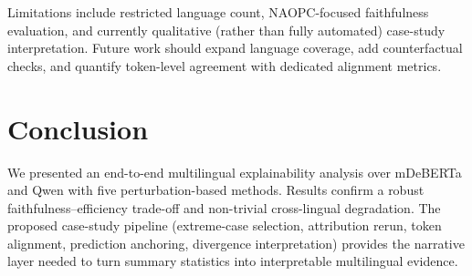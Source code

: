 \documentclass[11pt]{article}
\begin{document}
Limitations include restricted language count, NAOPC-focused faithfulness evaluation, and currently qualitative (rather than fully automated) case-study interpretation. Future work should expand language coverage, add counterfactual checks, and quantify token-level agreement with dedicated alignment metrics.

\section{Conclusion}
We presented an end-to-end multilingual explainability analysis over mDeBERTa and Qwen with five perturbation-based methods. Results confirm a robust faithfulness--efficiency trade-off and non-trivial cross-lingual degradation. The proposed case-study pipeline (extreme-case selection, attribution rerun, token alignment, prediction anchoring, divergence interpretation) provides the narrative layer needed to turn summary statistics into interpretable multilingual evidence.



\end{document}
